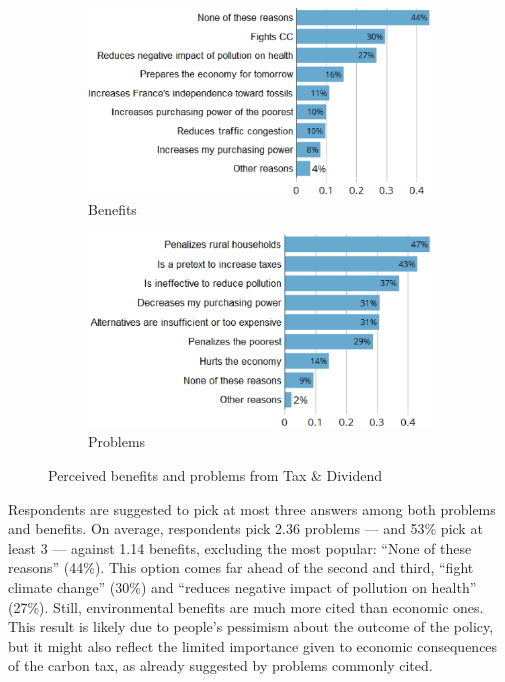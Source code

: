 \documentclass[english,5p,authoryear]{elsarticle}
\begin{document}
\begin{figure}[t]
\centering
\begin{subfigure}[b]{\columnwidth}
   \caption{Benefits}
   \includegraphics[width=\columnwidth]{Images_EPS/CC_benefits_synchro.eps}
\end{subfigure}

\begin{subfigure}[b]{\columnwidth}
\vspace{0.3cm}
   \caption{Problems}
   \includegraphics[width=\columnwidth]{Images_EPS/CC_problems_synchro.eps}
\end{subfigure}
\caption{Perceived benefits and problems from Tax \& Dividend}
   \label{fig:benefits_problems}
\end{figure}

Respondents are suggested to pick at most three answers among both problems and benefits. On average, respondents pick 2.36 problems --- and 53\% pick at least 3 --- against 1.14 benefits, excluding the most popular: ``None of these reasons'' (44\%). This option comes far ahead of the second and third, ``fight climate change'' (30\%) and ``reduces negative impact of pollution on health'' (27\%). Still, environmental benefits are much more cited than economic ones. This result is likely due to people's pessimism about the outcome of the policy, but it might also reflect the limited importance given to economic consequences of the carbon tax, as already suggested by problems commonly cited. %
\end{document}
